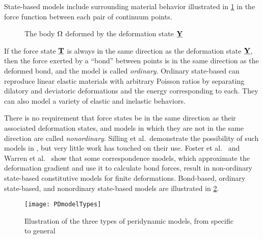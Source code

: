 State-based models include surrounding material behavior illustrated in \cref{fig:pdDeformed} in the force function between each pair of continuum points. 
%
\begin{figure}[h]
  \centering
{}
\caption{The body \protect\(\protect\Omega\protect\) deformed by the deformation state \protect\(\protect\vstate{Y}{}{}\protect\)}
\label{fig:pdDeformed}
\end{figure}
%
If the force state $\vstate{T}{}{}$ is always in the same direction as the deformation state $\vstate{Y}{}{}$, then the force exerted by a ``bond'' between points is in the same direction as the deformed bond, and the model is called \textit{ordinary}.  
Ordinary state-based can reproduce linear elastic materials with arbitrary Poisson ratios by separating dilatory and deviatoric deformations and the energy corresponding to each.
They can also model a variety of elastic and inelastic behaviors.

There is no requirement that force states be in the same direction as their associated deformation states, and models in which they are not in the same direction are called \textit{nonordinary}.
Silling et al.\ demonstrate the possibility of such models in \cite{silling2010peridynamic}, but very little work has touched on their use.  Foster et al.\ \cite{foster2010viscoplasticity} and Warren et al.\ \cite{warren2009non} show that some correspondence models, which approximate the deformation gradient and use it to calculate bond forces, result in non-ordinary state-based constitutive models for finite deformations.
Bond-based, ordinary state-based, and nonordinary state-based models are illustrated in \cref{fig:PDmodelTypes}.
%
\begin{figure}[h]
  \centering
\texttt{[image: PDmodelTypes]}
\caption[Illustration of the three types of peridynamic models]{Illustration of the three types of peridynamic models, from specific to general \cite{silling2007peridynamic}}
\label{fig:PDmodelTypes}
\end{figure}

